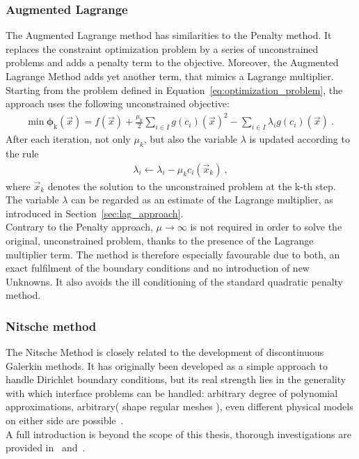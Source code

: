 \subsubsection{Augmented Lagrange}
The Augmented Lagrange method has similarities to the Penalty method. It replaces the constraint optimization problem by a series of unconstrained problems and adds a penalty term to the objective. Moreover, the Augmented Lagrange Method adds yet another term, that mimics a Lagrange multiplier.\\
Starting from the problem defined in Equation~\eqref{eq:optimization_problem}, the approach uses the following unconstrained objective:
\begin{align}
  \mathrm{min}~\boldsymbol{\phi}_\mathrm{k}(\vec{x})=f(\vec{x})+\frac{\mu_\mathrm{k}}{2} \sum_{i\in I} g(c_i)(\vec{x})^2 - \sum_{i\in I} \lambda_i g(c_i)(\vec{x})~. 
\end{align}
After each iteration, not only $\mu_k$, but also the variable $\lambda$ is updated according to the rule
\begin{align}
  \lambda_i \leftarrow \lambda_i-\mu_k c_i(\vec{x}_k)~, 
\end{align}
where $\vec{x}_k$ denotes the solution to the unconstrained problem at the k-th step.\\
The variable $\lambda$ can be regarded as an estimate of the Lagrange multiplier, as introduced in Section~\ref{sec:lag_approach}.\\
Contrary to the Penalty approach, $\mu \rightarrow \infty$ is not required in order to solve the original, unconstrained problem, thanks to the presence of the Lagrange multiplier term. The method is therefore especially favourable due to both, an exact fulfilment of the boundary conditions and no introduction of new Unknowns. It also avoids the ill conditioning of the standard quadratic penalty method.
\subsubsection{Nitsche method}\label{sec:nitsche_method}
The Nitsche Method is closely related to the development of discontinuous Galerkin methods. It has originally been developed as a simple approach to handle Dirichlet boundary conditions, but its real strength lies in the generality with which interface problems can be handled: arbitrary degree of polynomial approximations, arbitrary( shape regular meshes ), even different physical models on either side are possible~\cite{Hansbo2005}.\\
A full introduction is beyond the  scope of this thesis, thorough investigations are provided in~\cite{Nitsche1971} and~\cite{Hansbo2005}.\\